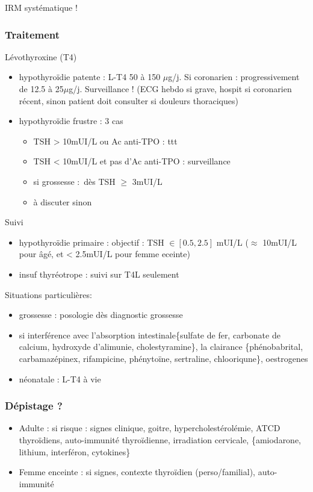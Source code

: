 \documentclass[11pt]{article}
\begin{document}
IRM systématique !

\subsubsection{Traitement}
\label{sec:orgaf1874a}
Lévothyroxine (T4) 
\begin{itemize}
\item hypothyroïdie patente : L-T4 50 à 150 \(\mu\)g/j. Si coronarien : \inc progressivement
de 12.5 à 25\(\mu\)g/j. \danger Surveillance ! (ECG hebdo si grave, hospit si coronarien
récent, sinon patient doit consulter si douleurs thoraciques)
\item hypothyroïdie frustre : 3 cas
\begin{itemize}
\item TSH > 10mUI/L ou Ac anti-TPO : ttt
\item TSH < 10mUI/L et pas d'Ac anti-TPO : surveillance
\item si grossesse : dès TSH \(\ge\) 3mUI/L
\item à discuter sinon
\end{itemize}
\end{itemize}

Suivi
\begin{itemize}
\item hypothyroïdie primaire : objectif : TSH \(\in [0.5, 2.5]\) mUI/L (\(\approx\) 10mUI/L pour âgé, et < 2.5mUI/L pour femme eceinte)
\item insuf thyréotrope : suivi sur T4L seulement
\end{itemize}

Situations particulières:
\begin{itemize}
\item grossesse : \inc posologie dès diagnostic grossesse
\item \inc si interférence avec l'absorption intestinale\{sulfate de fer, carbonate de calcium, hydroxyde
d'alimunie, cholestyramine\}, la clairance \{phénobabrital, carbamazépinex, rifampicine,
phénytoïne, sertraline, chlooriqune\}, oestrogenes
\item néonatale : L-T4 à vie
\end{itemize}

\subsubsection{Dépistage ?}
\label{sec:org1499e9a}
\begin{itemize}
\item Adulte : si risque : signes clinique, goitre, hypercholestérolémie, ATCD
thyroïdiens, auto-immunité thyroïdienne, irradiation cervicale, \{amiodarone,
lithium, interféron, cytokines\}
\item Femme enceinte : si signes, contexte thyroïdien (perso/familial), auto-immunité
\end{itemize}
\end{document}
